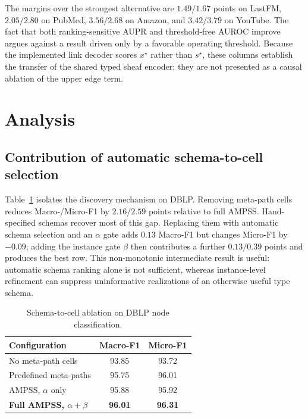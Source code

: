 \documentclass{article}
\newcommand{\ampss}{\textsc{AMPSS}}
\begin{document}
The margins over the strongest alternative are $1.49/1.67$ points on LastFM, $2.05/2.80$ on
PubMed, $3.56/2.68$ on Amazon, and $3.42/3.79$ on YouTube. The fact that both ranking-sensitive AUPR
and threshold-free AUROC improve argues against a result driven only by a favorable operating
threshold. Because the implemented link decoder scores $x^\star$ rather than $s^\star$, these
columns establish the transfer of the shared typed sheaf encoder; they are not presented as a
causal ablation of the upper edge term.

\section{Analysis}
\label{sec:analysis-results}

\subsection{Contribution of automatic schema-to-cell selection}

Table~\ref{tab:ablation-schema} isolates the discovery mechanism on DBLP. Removing meta-path cells
reduces Macro-/Micro-F1 by $2.16/2.59$ points relative to full \ampss{}. Hand-specified schemas
recover most of this gap. Replacing them with automatic schema selection and an $\alpha$ gate adds
$0.13$ Macro-F1 but changes Micro-F1 by $-0.09$; adding the instance gate $\beta$ then contributes a
further $0.13/0.39$ points and produces the best row. This non-monotonic intermediate result is
useful: automatic schema ranking alone is not sufficient, whereas instance-level refinement can
suppress uninformative realizations of an otherwise useful type schema.

\begin{table}[H]
  \centering
  \caption{Schema-to-cell ablation on DBLP node classification.}
  \label{tab:ablation-schema}
  \small
  \begin{tabular}{lcc}
    \toprule
    \textbf{Configuration} & Macro-F1 & Micro-F1 \\
    \midrule
    No meta-path cells & 93.85 & 93.72 \\
    Predefined meta-paths & 95.75 & 96.01 \\
    \ampss{}, $\alpha$ only & 95.88 & 95.92 \\
    \textbf{Full \ampss{}, $\alpha+\beta$} & \textbf{96.01} & \textbf{96.31} \\
    \bottomrule
  \end{tabular}
\end{table}
\end{document}
